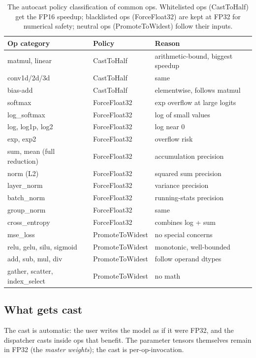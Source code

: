 \begin{table}[t]
\centering
\small
\begin{tabular}{lll}
\toprule
Op category & Policy & Reason \\
\midrule
matmul, linear & CastToHalf & arithmetic-bound, biggest speedup \\
conv1d/2d/3d   & CastToHalf & same \\
bias-add       & CastToHalf & elementwise, follows matmul \\
softmax        & ForceFloat32 & exp overflow at large logits \\
log\_softmax   & ForceFloat32 & log of small values \\
log, log1p, log2 & ForceFloat32 & log near 0 \\
exp, exp2      & ForceFloat32 & overflow risk \\
sum, mean (full reduction) & ForceFloat32 & accumulation precision \\
norm (L2)      & ForceFloat32 & squared sum precision \\
layer\_norm    & ForceFloat32 & variance precision \\
batch\_norm    & ForceFloat32 & running-stats precision \\
group\_norm    & ForceFloat32 & same \\
cross\_entropy & ForceFloat32 & combines log + sum \\
mse\_loss      & PromoteToWidest & no special concerns \\
relu, gelu, silu, sigmoid & PromoteToWidest & monotonic, well-bounded \\
add, sub, mul, div & PromoteToWidest & follow operand dtypes \\
gather, scatter, index\_select & PromoteToWidest & no math \\
\bottomrule
\end{tabular}
\caption[AMP policy by op family.]{The autocast policy
classification of common ops. Whitelisted ops (CastToHalf) get
the FP16 speedup; blacklisted ops (ForceFloat32) are kept at
FP32 for numerical safety; neutral ops (PromoteToWidest) follow
their inputs.}
\label{tab:amp:full_policy}
\end{table}

\subsection{What gets cast}
\label{ssec:amp:what_cast}

The cast is automatic: the user writes the model as if it were
FP32, and the dispatcher casts inside ops that benefit. The
parameter tensors themselves remain in FP32 (the \emph{master
weights}); the cast is per-op-invocation.

